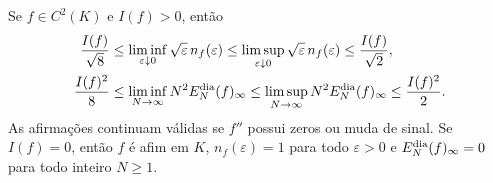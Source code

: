 \begin{theorem}\label{map:artigo_2:11.3}
\label{artigo_2:thm:general-dyadic-envelope}
Se $f\in C^2(K)$ e $I(f)>0$, então
\begin{align}
 \frac{I(f)}{\sqrt8}
 &\le \liminf_{\varepsilon\downarrow0}
       \sqrt\varepsilon\,n_f(\varepsilon)
 \le \limsup_{\varepsilon\downarrow0}
       \sqrt\varepsilon\,n_f(\varepsilon)
 \le \frac{I(f)}{\sqrt2},
 \label{artigo_2:eq:threshold-envelope}\\
 \frac{I(f)^2}{8}
 &\le \liminf_{N\to\infty}N^2E_N^{\rm dia}(f)_\infty
 \le \limsup_{N\to\infty}N^2E_N^{\rm dia}(f)_\infty
 \le \frac{I(f)^2}{2}.
 \label{artigo_2:eq:budget-envelope}
\end{align}
As afirmações continuam válidas se $f''$ possui zeros ou muda de sinal. Se
$I(f)=0$, então $f$ é afim em $K$, $n_f(\varepsilon)=1$ para todo $\varepsilon>0$ e
$E_N^{\rm dia}(f)_\infty=0$ para todo inteiro $N\ge1$.
\end{theorem}

